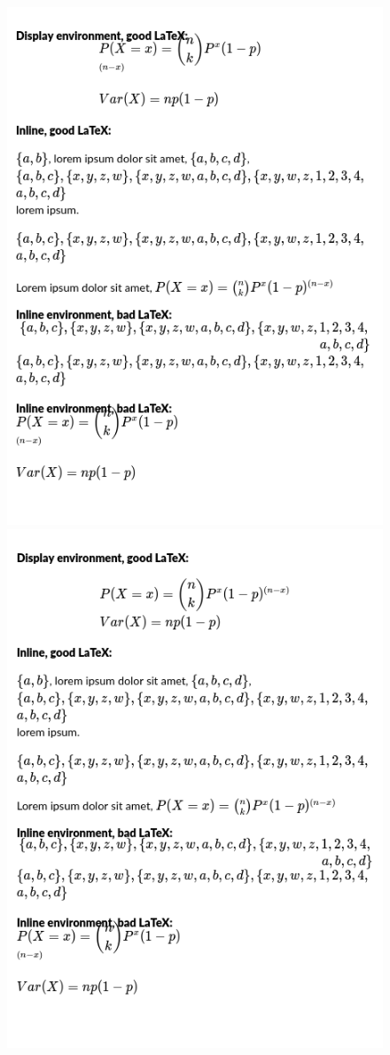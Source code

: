 \documentclass[main.tex]{subfiles}
\begin{document}
\begin{figure}[H]
\includegraphics[scale=0.40]{images/solution2.png}
\includegraphics[scale=0.40]{images/solution3.png}
\centering
\end{figure}
\end{document}
